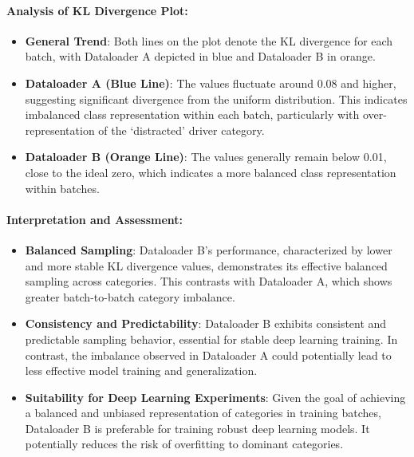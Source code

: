 \paragraph{Analysis of KL Divergence Plot:}
\begin{itemize}
    \item \textbf{General Trend}: Both lines on the plot denote the KL divergence for each batch, with Dataloader A depicted in blue and Dataloader B in orange.
    \item \textbf{Dataloader A (Blue Line)}: The values fluctuate around 0.08 and higher, suggesting significant divergence from the uniform distribution. This indicates imbalanced class representation within each batch, particularly with over-representation of the `distracted' driver category.
    \item \textbf{Dataloader B (Orange Line)}: The values generally remain below 0.01, close to the ideal zero, which indicates a more balanced class representation within batches.
\end{itemize}

\paragraph{Interpretation and Assessment:}
\begin{itemize}
    \item \textbf{Balanced Sampling}: Dataloader B's performance, characterized by lower and more stable KL divergence values, demonstrates its effective balanced sampling across categories. This contrasts with Dataloader A, which shows greater batch-to-batch category imbalance.
    \item \textbf{Consistency and Predictability}: Dataloader B exhibits consistent and predictable sampling behavior, essential for stable deep learning training. In contrast, the imbalance observed in Dataloader A could potentially lead to less effective model training and generalization.
    \item \textbf{Suitability for Deep Learning Experiments}: Given the goal of achieving a balanced and unbiased representation of categories in training batches, Dataloader B is preferable for training robust deep learning models. It potentially reduces the risk of overfitting to dominant categories.
\end{itemize}

